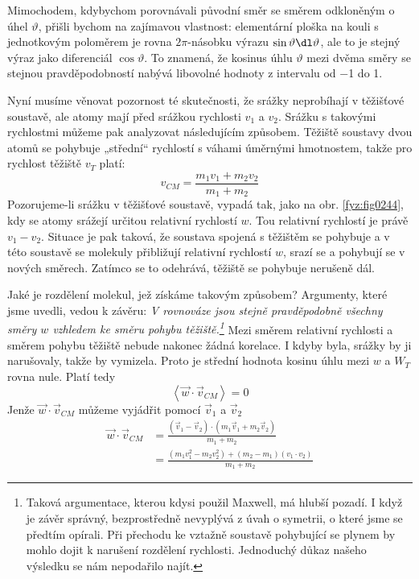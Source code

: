     Mimochodem, kdybychom porovnávali původní směr se směrem odkloněným o úhel \(\vartheta\), přišli
    bychom na zajímavou vlastnost: elementární ploška na kouli s jednotkovým poloměrem je rovna
    \(2\pi\)-násobku výrazu \(\sin\vartheta\dl\vartheta\), ale to je stejný výraz jako diferenciál
    \(\cos\vartheta\). To znamená, že kosinus úhlu \(\vartheta\) mezi dvěma směry se stejnou
    pravděpodobností nabývá libovolné hodnoty z intervalu od \num{-1} do \num{+1}.

    Nyní musíme věnovat pozornost té skutečnosti, že srážky neprobíhají v těžišťové soustavě, ale
    atomy mají před srážkou rychlosti \(v_1\) a \(v_2\). Srážku s takovými rychlostmi můžeme pak
    analyzovat následujícím způsobem. Těžiště soustavy dvou atomů se pohybuje „střední“ rychlostí s
    váhami úměrnými hmotnostem, takže pro rychlost těžiště \(v_T\) platí: 
    \begin{equation*}
      v_{CM} = \frac{m_1v_1 + m_2v_2}{m_1 + m_2}
    \end{equation*}
    Pozorujeme-li srážku v těžišťové soustavě, vypadá tak, jako na obr. \ref{fyz:fig0244}, kdy se
    atomy srážejí určitou relativní rychlostí \(w\). Tou relativní rychlostí je právě \(v_1-v_2\).
    Situace je pak taková, že soustava spojená s těžištěm se pohybuje a v této soustavě se molekuly
    přibližují relativní rychlostí \(w\), srazí se a pohybují se v nových směrech. Zatímco se to
    odehrává, těžiště se pohybuje nerušeně dál.

    Jaké je rozdělení molekul, jež získáme takovým způsobem? Argumenty, které jsme uvedli, vedou k
    závěru: \emph{V rovnováze jsou stejně pravděpodobně všechny směry \(w\) vzhledem ke směru pohybu
    těžiště.\footnote{Taková argumentace, kterou kdysi použil Maxwell, má hlubší pozadí. I když je
    závěr správný, bezprostředně nevyplývá z úvah o symetrii, o které jsme se předtím opírali. Při
    přechodu ke vztažně soustavě pohybující se plynem by mohlo dojit k narušení rozdělení rychlosti.
    Jednoduchý důkaz našeho výsledku se nám nepodařilo najít.}} Mezi směrem relativní rychlosti a
    směrem pohybu těžiště nebude nakonec žádná korelace. I kdyby byla, srážky by ji narušovaly,
    takže by vymizela. Proto je střední hodnota kosinu úhlu mezi \(w\) a \(W_T\) rovna nule. Platí
    tedy
    \begin{equation}\label{fyz:eq629}
      \left\langle\vec{w}\cdot\vec{v}_{CM}\right\rangle = 0
    \end{equation}
    Jenže \(\vec{w}\cdot\vec{v}_{CM}\) můžeme vyjádřit pomocí \(\vec{v}_1\) a \(\vec{v}_2\)
    \begin{align}
      \vec{w}\cdot\vec{v}_{CM} 
        &= \frac{(\vec{v}_1−\vec{v}_2)\cdot(m_1\vec{v}_1+m_2\vec{v}_2)}{m_1+m_2} \nonumber \\
        &= \frac{(m_1v^2_1−m_2v^2_2)+(m_2−m_1)(v_1\cdot v_2)}{m_1+m_2} \label{fyz:eq630}
    \end{align}


